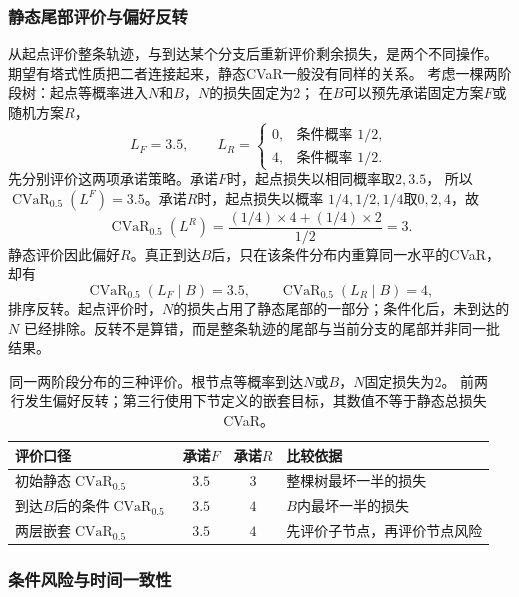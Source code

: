 \subsubsection{静态尾部评价与偏好反转}

从起点评价整条轨迹，与到达某个分支后重新评价剩余损失，是两个不同操作。
期望有塔式性质把二者连接起来，静态CVaR一般没有同样的关系。
考虑一棵两阶段树：起点等概率进入$N$和$B$，$N$的损失固定为$2$；
在$B$可以预先承诺固定方案$F$或随机方案$R$，
\[
  L_F=3.5,\qquad
  L_R=
  \begin{cases}
    0,&\text{条件概率 }1/2,\\
    4,&\text{条件概率 }1/2.
  \end{cases}
\]
先分别评价这两项承诺策略。承诺$F$时，起点损失以相同概率取$2,3.5$，
所以$\operatorname{CVaR}_{0.5}(L^F)=3.5$。承诺$R$时，起点损失以概率
$1/4,1/2,1/4$取$0,2,4$，故
\[
  \operatorname{CVaR}_{0.5}(L^R)
  =\frac{(1/4)\times4+(1/4)\times2}{1/2}=3.
\]
静态评价因此偏好$R$。真正到达$B$后，只在该条件分布内重算同一水平的CVaR，
却有
\[
  \operatorname{CVaR}_{0.5}(L_F\mid B)=3.5,\qquad
  \operatorname{CVaR}_{0.5}(L_R\mid B)=4,
\]
排序反转。起点评价时，$N$的损失占用了静态尾部的一部分；条件化后，未到达的$N$
已经排除。反转不是算错，而是整条轨迹的尾部与当前分支的尾部并非同一批结果。

\begin{table}[htbp]
  \centering
  \begin{tabularx}{\linewidth}{XccX}
    \toprule
    评价口径 & 承诺$F$ & 承诺$R$ & 比较依据\\
    \midrule
    初始静态$\operatorname{CVaR}_{0.5}$ & $3.5$ & $3$ & 整棵树最坏一半的损失\\
    到达$B$后的条件$\operatorname{CVaR}_{0.5}$ & $3.5$ & $4$ & $B$内最坏一半的损失\\
    两层嵌套$\operatorname{CVaR}_{0.5}$ & $3.5$ & $4$ & 先评价子节点，再评价节点风险\\
    \bottomrule
  \end{tabularx}
  \caption{同一两阶段分布的三种评价。根节点等概率到达$N$或$B$，$N$固定损失为$2$。
  前两行发生偏好反转；第三行使用下节定义的嵌套目标，其数值不等于静态总损失CVaR。}
  \label{tab:decision-static-conditional-nested}
\end{table}

\subsubsection{条件风险与时间一致性}

